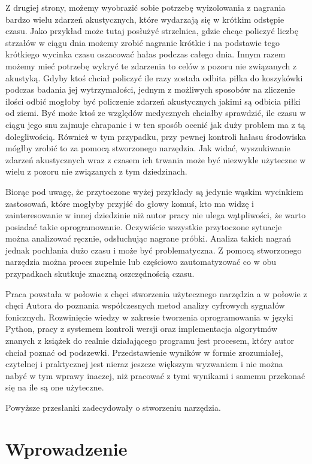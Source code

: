 \documentclass[12pt,a4paper]{article}
\begin{document}
Z drugiej strony, możemy wyobrazić sobie potrzebę wyizolowania z nagrania bardzo wielu zdarzeń akustycznych, które wydarzają się w krótkim odstępie czasu. Jako przykład może tutaj posłużyć strzelnica, gdzie chcąc policzyć liczbę strzałów w ciągu dnia możemy zrobić nagranie krótkie i na podstawie tego krótkiego wycinka czasu oszacować hałas podczas całego dnia. Innym razem możemy mieć potrzebę wykryć te zdarzenia to celów z pozoru nie związanych z akustyką. Gdyby ktoś chciał policzyć ile razy została odbita piłka do koszykówki podczas badania jej wytrzymałości, jednym z możliwych sposobów na zliczenie ilości odbić mogłoby być policzenie zdarzeń akustycznych jakimi są odbicia piłki od ziemi. Być może ktoś ze względów medycznych chciałby sprawdzić, ile czasu w ciągu jego snu zajmuje chrapanie i w ten sposób ocenić jak duży problem ma z tą dolegliwością. Również w tym przypadku, przy pewnej kontroli hałasu środowiska mógłby zrobić to za pomocą stworzonego narzędzia. Jak widać, wyszukiwanie zdarzeń akustycznych wraz z czasem ich trwania może być niezwykle użyteczne w wielu z pozoru nie związanych z tym dziedzinach. 


Biorąc pod uwagę, że przytoczone wyżej przykłady są jedynie wąskim wycinkiem zastosowań, które mogłyby przyjść do głowy komuś, kto ma widzę i zainteresowanie w innej dziedzinie niż autor pracy nie ulega wątpliwości, że warto posiadać takie oprogramowanie. Oczywiście wszystkie przytoczone sytuacje można analizować ręcznie, odsłuchując nagrane próbki. Analiza takich nagrań jednak pochłania dużo czasu i może być problematyczna. Z pomocą stworzonego narzędzia można proces zupełnie lub częściowo zautomatyzować co w obu przypadkach skutkuje znaczną oszczędnością czasu. 

Praca powstała w połowie z chęci stworzenia użytecznego narzędzia a w połowie z chęci Autora do poznania współczesnych metod analizy cyfrowych sygnałów fonicznych. Rozwinięcie wiedzy w zakresie tworzenia oprogramowania w języki Python, pracy z systemem kontroli wersji oraz implementacja algorytmów znanych z książek do realnie działającego programu jest procesem, który autor chciał poznać od podszewki. Przedstawienie wyników w formie zrozumiałej, czytelnej i praktycznej jest nieraz jeszcze większym wyzwaniem i nie można nabyć w tym wprawy inaczej, niż pracować z tymi wynikami i samemu przekonać się na ile są one użyteczne.

Powyższe przesłanki zadecydowały o stworzeniu narzędzia. 
\section{Wprowadzenie}
\end{document}
